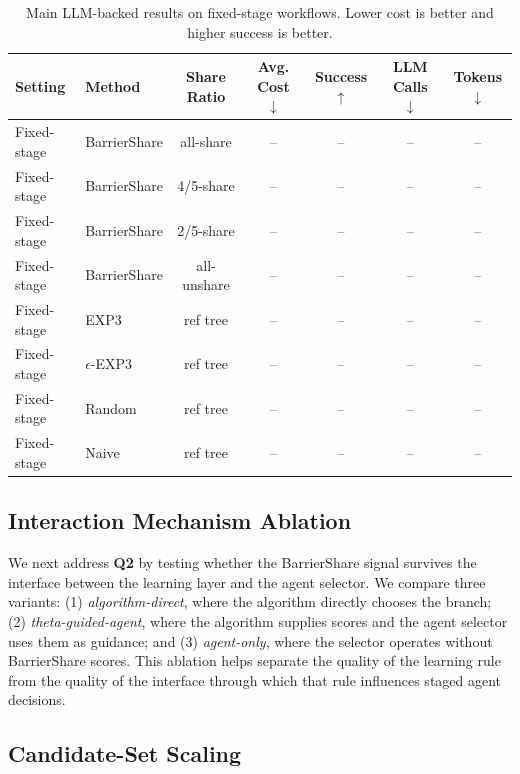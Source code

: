\documentclass{article}
\begin{document}
\begin{table}[t]
    \centering
    \small
    \caption{Main LLM-backed results on fixed-stage workflows. Lower cost is better and higher success is better.}
    \label{tab:llm_main}
    \begin{tabular}{llccccc}
        \toprule
        Setting & Method & Share Ratio & Avg. Cost $\downarrow$ & Success $\uparrow$ & LLM Calls $\downarrow$ & Tokens $\downarrow$ \\
        \midrule
        Fixed-stage & BarrierShare & all-share & -- & -- & -- & -- \\
        Fixed-stage & BarrierShare & 4/5-share & -- & -- & -- & -- \\
        Fixed-stage & BarrierShare & 2/5-share & -- & -- & -- & -- \\
        Fixed-stage & BarrierShare & all-unshare & -- & -- & -- & -- \\
        Fixed-stage & EXP3 & ref tree & -- & -- & -- & -- \\
        Fixed-stage & $\epsilon$-EXP3 & ref tree & -- & -- & -- & -- \\
        Fixed-stage & Random & ref tree & -- & -- & -- & -- \\
        Fixed-stage & Naive & ref tree & -- & -- & -- & -- \\
        \bottomrule
    \end{tabular}
\end{table}

\subsection{Interaction Mechanism Ablation}

We next address \textbf{Q2} by testing whether the BarrierShare signal survives the interface between the learning layer and the agent selector. We compare three variants:
(1) \emph{algorithm-direct}, where the algorithm directly chooses the branch;
(2) \emph{theta-guided-agent}, where the algorithm supplies scores and the agent selector uses them as guidance; and
(3) \emph{agent-only}, where the selector operates without BarrierShare scores.
This ablation helps separate the quality of the learning rule from the quality of the interface through which that rule influences staged agent decisions.

\subsection{Candidate-Set Scaling}
\end{document}
